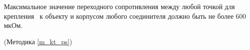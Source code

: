 Максимальное значение переходного сопротивления между любой точкой для крепления \dut \ к объекту и корпусом любого соединителя должно быть не более 600 мкОм.

\begin{flushright}
(Методика \ref{m_kt_ps})
\end{flushright}

